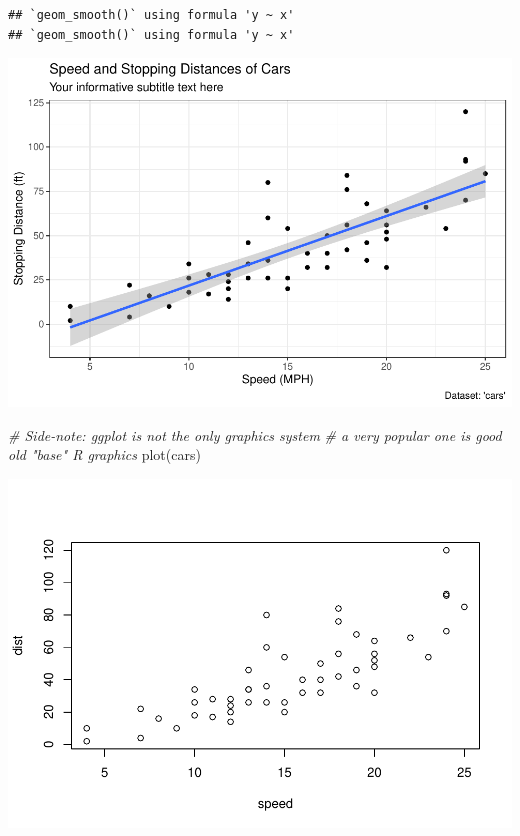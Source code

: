 \documentclass[
]{article}
\newenvironment{Shaded}{\begin{snugshade}}{\end{snugshade}}
\newcommand{\CommentTok}[1]{\textcolor[rgb]{0.56,0.35,0.01}{\textit{#1}}}
\newcommand{\FunctionTok}[1]{\textcolor[rgb]{0.00,0.00,0.00}{#1}}
\newcommand{\NormalTok}[1]{#1}
\begin{document}
\begin{verbatim}
## `geom_smooth()` using formula 'y ~ x'
## `geom_smooth()` using formula 'y ~ x'
\end{verbatim}

\includegraphics{class05_files/figure-latex/unnamed-chunk-1-1.pdf}

\begin{Shaded}
\begin{Highlighting}[]
\CommentTok{\# Side{-}note: ggplot is not the only graphics system}
\CommentTok{\# a very popular one is good old "base" R graphics}
\FunctionTok{plot}\NormalTok{(cars)}
\end{Highlighting}
\end{Shaded}

\includegraphics{class05_files/figure-latex/unnamed-chunk-1-2.pdf}
\end{document}
